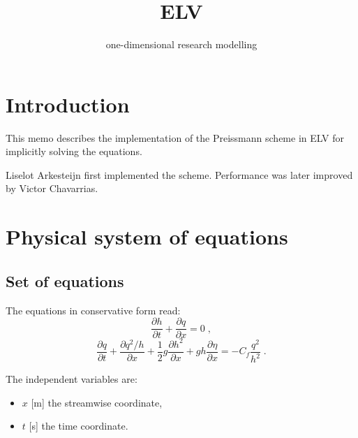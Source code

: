 \documentclass{deltares_manual}
\newcommand{\ELV}{\textsc{ELV}}
\begin{document}
\title{\ELV}
\subtitle{one-dimensional research modelling}

\deltarestitle

\section{Introduction}

This memo describes the implementation of the Preissmann scheme \citep{Preissmann61_2,Preissman61_3,Lyn87_2} in \ELV{} for implicitly solving the \citet{SaintVenant71} equations. 

Liselot Arkesteijn first implemented the scheme. Performance was later improved by Victor Chavarrias. 

\section{Physical system of equations}

\subsection{Set of equations}

The \citet{SaintVenant71} equations in conservative form read:
\begin{equation}
\label{eq:sv_mass}
\frac{\partial h}{\partial t}+\frac{\partial q}{\partial x}=0 \;,
\end{equation}
\begin{equation}
\label{eq:sv_mom}
\frac{\partial q}{\partial t}+\frac{\partial q^2/h}{\partial x}+\frac{1}{2}g\frac{\partial h^2}{\partial x}+gh\frac{\partial \eta}{\partial x}=-C_f\frac{q^2}{h^2} \;.
\end{equation}

The independent variables are:
\begin{itemize}
\item $x$ [\si{m}] the streamwise coordinate,
\item $t$ [\si{s}] the time coordinate.
\end{itemize}
\end{document}
